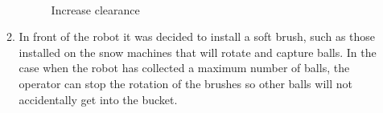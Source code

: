 \begin{enumerate}
\begin{enumerate}
      \begin{figure}[H]
      	\begin{minipage}[h]{1\linewidth}
      		\caption{Increase clearance} 
      	\end{minipage}
      \end{figure}
        
      \item In front of the robot it was decided to install a soft brush, such as those installed on the snow machines that will rotate and capture balls. In the case when the robot has collected a maximum number of balls, the operator can stop the rotation of the brushes so other balls will not accidentally get into the bucket.
      

\end{enumerate}
\end{enumerate}
